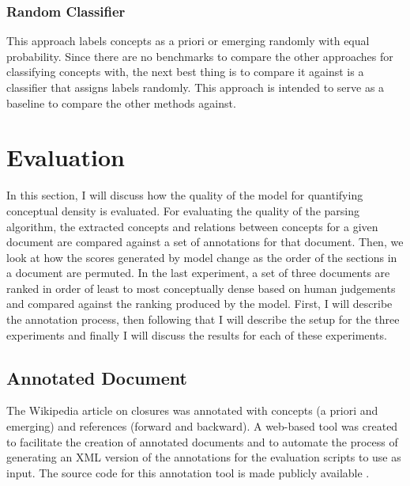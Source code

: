 \documentclass[12pt]{article}
\theoremstyle{grammarstyle}
\begin{document}
\subsubsection{Random Classifier} This approach labels concepts as a priori or emerging randomly with equal probability. Since there are no benchmarks to compare the other approaches for classifying concepts with, the next best thing is to compare it against is a classifier that assigns labels randomly. This approach is intended to serve as a baseline to compare the other methods against.

\section{Evaluation} \label{sec:evaluation}
In this section, I will discuss how the quality of the model for quantifying conceptual density is evaluated.
For evaluating the quality of the parsing algorithm, the extracted concepts and relations between concepts for a given document are compared against a set of annotations for that document.
Then, we look at how the scores generated by model change as the order of the sections in a document are permuted.
In the last experiment, a set of three documents are ranked in order of least to most conceptually dense based on human judgements and compared against the ranking produced by the model.
First, I will describe the annotation process, then following that I will describe the setup for the three experiments and finally I will discuss the results for each of these experiments.

\subsection{Annotated Document} \label{sec:annotated_document}
The Wikipedia article on closures \citep{wiki:closure} was annotated with concepts (a priori and emerging) and references (forward and backward).
A web-based tool was created to facilitate the creation of annotated documents and to automate the process of generating an XML version of the annotations for the evaluation scripts to use as input. The source code for this annotation tool is made publicly available \citep{anthony_dickson_2019_3458618}.
\end{document}
